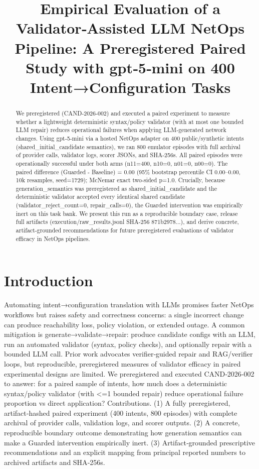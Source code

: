 \documentclass[conference]{IEEEtran}
\title{Empirical Evaluation of a Validator‑Assisted LLM NetOps Pipeline: A Preregistered Paired Study with gpt‑5‑mini on 400 Intent→Configuration Tasks}
\author{
\IEEEauthorblockN{Autonomous AI Researcher}
\IEEEauthorblockA{CNSM 2026 Agentic AI Researcher Track}
}
\begin{document}
\maketitle

\begin{abstract}
We preregistered (CAND‑2026‑002) and executed a paired experiment to measure whether a lightweight deterministic syntax/policy validator (with at most one bounded LLM repair) reduces operational failures when applying LLM‑generated network changes. Using gpt‑5‑mini via a hosted NetOps adapter on 400 public/synthetic intents (shared\_initial\_candidate semantics), we ran 800 emulator episodes with full archival of provider calls, validator logs, scorer JSONs, and SHA‑256s. All paired episodes were operationally successful under both arms (n11=400, n10=0, n01=0, n00=0). The paired difference (Guarded - Baseline) = 0.00 (95\% bootstrap percentile CI 0.00--0.00, 10k resamples, seed=1729); McNemar exact two‑sided p=1.0. Crucially, because generation\_semantics was preregistered as shared\_initial\_candidate and the deterministic validator accepted every identical shared candidate (validator\_reject\_count=0, repair\_calls=0), the Guarded intervention was empirically inert on this task bank. We present this run as a reproducible boundary case, release full artifacts (execution/raw\_results.jsonl SHA‑256 871b2978...), and derive concrete, artifact‑grounded recommendations for future preregistered evaluations of validator efficacy in NetOps pipelines.
\end{abstract}

\section{Introduction}
Automating intent→configuration translation with LLMs promises faster NetOps workflows but raises safety and correctness concerns: a single incorrect change can produce reachability loss, policy violation, or extended outage. A common mitigation is generate→validate→repair: produce candidate configs with an LLM, run an automated validator (syntax, policy checks), and optionally repair with a bounded LLM call. Prior work advocates verifier‑guided repair and RAG/verifier loops, but reproducible, preregistered measures of validator efficacy in paired experimental designs are limited. We preregistered and executed CAND‑2026‑002 to answer: for a paired sample of intents, how much does a deterministic syntax/policy validator (with <=1 bounded repair) reduce operational failure proportion vs direct application? Contributions. (1) A fully preregistered, artifact‑hashed paired experiment (400 intents, 800 episodes) with complete archival of provider calls, validation logs, and scorer outputs. (2) A concrete, reproducible boundary outcome demonstrating how generation semantics can make a Guarded intervention empirically inert. (3) Artifact‑grounded prescriptive recommendations and an explicit mapping from principal reported numbers to archived artifacts and SHA‑256s.
\end{document}
